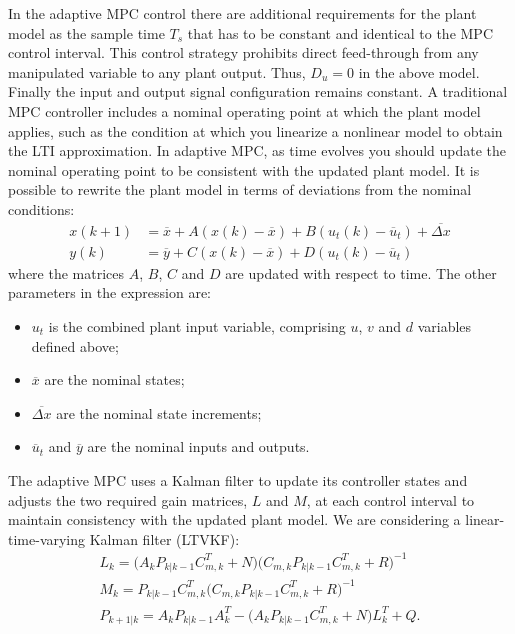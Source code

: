\documentclass[conference, 11pt]{IEEEtran}
\begin{document}
In the adaptive MPC control there are additional requirements for the plant model as the sample time $T_s$ that has to be constant and identical to the MPC control interval. This control strategy prohibits direct feed-through from any manipulated variable to any plant output. Thus, $D_u = 0$ in the above model. Finally the input and output signal configuration remains constant.
A traditional MPC controller includes a nominal operating point at which the plant model applies, such as the condition at which you linearize a nonlinear model to obtain the LTI approximation. In adaptive MPC, as time evolves you should update the nominal operating point to be consistent with the updated plant model. It is possible to rewrite the plant model in terms of deviations from the nominal conditions:
\begin{equation*}
\label{eqn:Adaptive_MPC_nominal_condition}
\begin{aligned}
x(k+1)&=\overline{x}+A(x(k)-\overline{x})+ B(u_t(k)-\overline{u}_t)+\overline{\Delta x}\\
y(k)&=\overline{y}+C(x(k)-\overline{x}) + D(u_t(k)-\overline{u}_t)
\end{aligned}
\end{equation*}
where the matrices $A$, $B$, $C$ and $D$ are updated with respect to time. The other parameters in the expression are:
\begin{itemize}
	\item $u_t$ is the combined plant input variable, comprising $u$, $v$ and $d$ variables defined above;
	\item $\overline{x}$ are the nominal states;
	\item $\overline{\Delta x}$ are the nominal state increments;
	\item $\overline{u}_t$ and $\overline{y}$ are the nominal inputs and outputs.
\end{itemize} 
The adaptive MPC uses a Kalman filter to update its controller states and adjusts the two required gain matrices, $L$ and $M$, at each control interval to maintain consistency with the updated plant model. We are considering a linear-time-varying Kalman filter (LTVKF):
\begin{equation*}
\label{eqn:LTVKF}
\begin{array}{lll}
L_k=\big(A_kP_{k|k-1}C_{m,k}^{T}+N\big)\big(C_{m,k}P_{k|k-1}C_{m,k}^{T}+R\big)^{-1}\\
M_k =P_{k|k-1}C_{m,k}^{T}\big(C_{m,k}P_{k|k-1}C_{m,k}^{T}+R\big)^{-1}\\
P_{k+1|k}=A_kP_{k|k-1}A_k^{T}-\big(A_kP_{k|k-1}C_{m,k}^{T}+N\big)L_k^{T}+Q.
\end{array}
\end{equation*}
\end{document}

